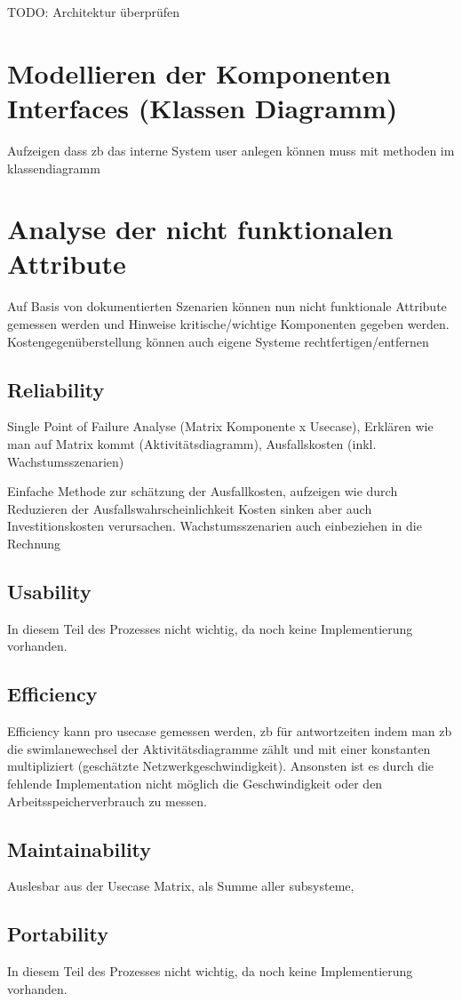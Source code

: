 TODO: Architektur überprüfen

\section{Modellieren der Komponenten Interfaces (Klassen Diagramm)}
Aufzeigen dass zb das interne System user anlegen können muss mit methoden im klassendiagramm

\section{Analyse der nicht funktionalen Attribute}
Auf Basis von dokumentierten Szenarien können nun nicht funktionale Attribute gemessen werden und Hinweise kritische/wichtige Komponenten gegeben werden. Kostengegenüberstellung können auch eigene Systeme rechtfertigen/entfernen

\subsection{Reliability}
Single Point of Failure Analyse (Matrix Komponente x Usecase), Erklären wie man auf Matrix kommt (Aktivitätsdiagramm), Ausfallskosten (inkl. Wachstumsszenarien)

Einfache Methode zur schätzung der Ausfallkosten, aufzeigen wie durch Reduzieren der Ausfallswahrscheinlichkeit Kosten sinken aber auch Investitionskosten verursachen. Wachstumsszenarien auch einbeziehen in die Rechnung
\subsection{Usability}
In diesem Teil des Prozesses nicht wichtig, da noch keine Implementierung vorhanden.

\subsection{Efficiency}
Efficiency kann pro usecase gemessen werden, zb für antwortzeiten indem man zb die swimlanewechsel der Aktivitätsdiagramme zählt und mit einer konstanten multipliziert (geschätzte Netzwerkgeschwindigkeit). Ansonsten ist es durch die fehlende Implementation nicht möglich die Geschwindigkeit oder den Arbeitsspeicherverbrauch zu messen.

\subsection{Maintainability}
Auslesbar aus der Usecase Matrix, als Summe aller subsysteme,

\subsection{Portability}
In diesem Teil des Prozesses nicht wichtig, da noch keine Implementierung vorhanden.
